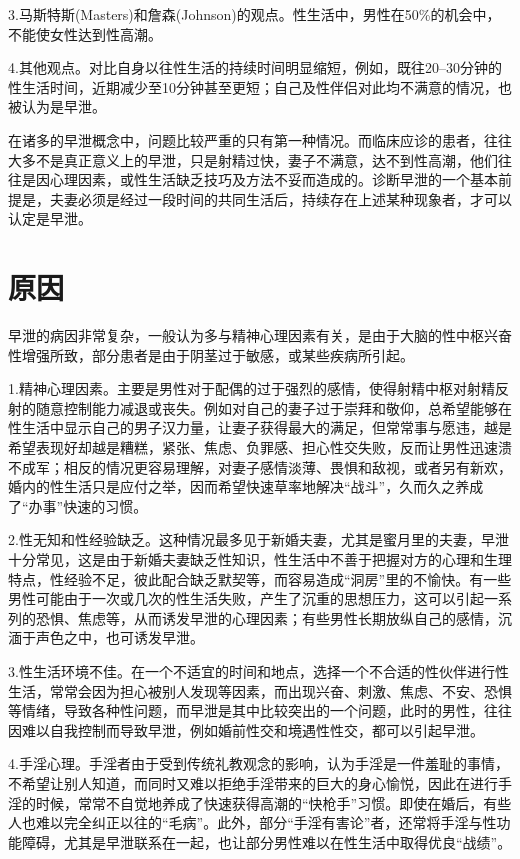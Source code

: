 \documentclass[12pt,UTF8]{ctexbook}
\begin{document}
3.马斯特斯(Masters)和詹森(Johnson)的观点。性生活中，男性在50\%的机会中，不能使女性达到性高潮。

4.其他观点。对比自身以往性生活的持续时间明显缩短，例如，既往20--30分钟的性生活时间，近期减少至10分钟甚至更短；自己及性伴侣对此均不满意的情况，也被认为是早泄。

在诸多的早泄概念中，问题比较严重的只有第一种情况。而临床应诊的患者，往往大多不是真正意义上的早泄，只是射精过快，妻子不满意，达不到性高潮，他们往往是因心理因素，或性生活缺乏技巧及方法不妥而造成的。诊断早泄的一个基本前提是，夫妻必须是经过一段时间的共同生活后，持续存在上述某种现象者，才可以认定是早泄。

\section{原因}

早泄的病因非常复杂，一般认为多与精神心理因素有关，是由于大脑的性中枢兴奋性增强所致，部分患者是由于阴茎过于敏感，或某些疾病所引起。

1.精神心理因素。主要是男性对于配偶的过于强烈的感情，使得射精中枢对射精反射的随意控制能力减退或丧失。例如对自己的妻子过于崇拜和敬仰，总希望能够在性生活中显示自己的男子汉力量，让妻子获得最大的满足，但常常事与愿违，越是希望表现好却越是糟糕，紧张、焦虑、负罪感、担心性交失败，反而让男性迅速溃不成军；相反的情况更容易理解，对妻子感情淡薄、畏惧和敌视，或者另有新欢，婚内的性生活只是应付之举，因而希望快速草率地解决“战斗”，久而久之养成了“办事”快速的习惯。

2.性无知和性经验缺乏。这种情况最多见于新婚夫妻，尤其是蜜月里的夫妻，早泄十分常见，这是由于新婚夫妻缺乏性知识，性生活中不善于把握对方的心理和生理特点，性经验不足，彼此配合缺乏默契等，而容易造成“洞房”里的不愉快。有一些男性可能由于一次或几次的性生活失败，产生了沉重的思想压力，这可以引起一系列的恐惧、焦虑等，从而诱发早泄的心理因素；有些男性长期放纵自己的感情，沉湎于声色之中，也可诱发早泄。

3.性生活环境不佳。在一个不适宜的时间和地点，选择一个不合适的性伙伴进行性生活，常常会因为担心被别人发现等因素，而出现兴奋、刺激、焦虑、不安、恐惧等情绪，导致各种性问题，而早泄是其中比较突出的一个问题，此时的男性，往往因难以自我控制而导致早泄，例如婚前性交和境遇性性交，都可以引起早泄。

4.手淫心理。手淫者由于受到传统礼教观念的影响，认为手淫是一件羞耻的事情，不希望让别人知道，而同时又难以拒绝手淫带来的巨大的身心愉悦，因此在进行手淫的时候，常常不自觉地养成了快速获得高潮的“快枪手”习惯。即使在婚后，有些人也难以完全纠正以往的“毛病”。此外，部分“手淫有害论”者，还常将手淫与性功能障碍，尤其是早泄联系在一起，也让部分男性难以在性生活中取得优良“战绩”。
\end{document}
